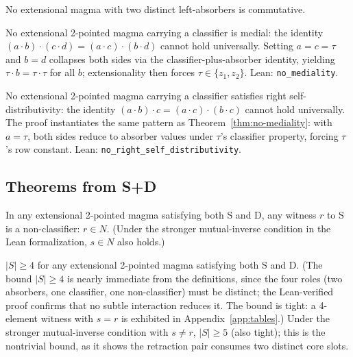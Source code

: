 \documentclass[sigconf,screen]{acmart}
\newcommand{\dotop}{\cdot}
\theoremstyle{remark}
\begin{document}
\begin{theorem}[Asymmetry]
\label{thm:asymmetry}
No extensional magma with two distinct left-absorbers is commutative.
\end{theorem}

\begin{theorem}[No Mediality]
\label{thm:no-mediality}
No extensional 2-pointed magma carrying a classifier is medial: the identity $(a \dotop b) \dotop (c \dotop d) = (a \dotop c) \dotop (b \dotop d)$ cannot hold universally. Setting $a = c = \tau$ and $b = d$ collapses both sides via the classifier-plus-absorber identity, yielding $\tau \dotop b = \tau \dotop \tau$ for all $b$; extensionality then forces $\tau \in \{z_1, z_2\}$. Lean: \texttt{no\_mediality}.
\end{theorem}

\begin{theorem}
\label{thm:no-rsd}
No extensional 2-pointed magma carrying a classifier satisfies right self-distributivity: the identity $(a \dotop b) \dotop c = (a \dotop c) \dotop (b \dotop c)$ cannot hold universally. The proof instantiates the same pattern as Theorem~\ref{thm:no-mediality}: with $a = \tau$, both sides reduce to absorber values under $\tau$'s classifier property, forcing $\tau$'s row constant. Lean: \texttt{no\_right\_self\_distributivity}.
\end{theorem}

\subsection{Theorems from S+D}

\begin{theorem}
\label{thm:placement}
In any extensional 2-pointed magma satisfying both S and D, any witness $r$ to S is a non-classifier: $r \in N$. (Under the stronger mutual-inverse condition in the Lean formalization, $s \in N$ also holds.)
\end{theorem}

\begin{theorem}
\label{thm:card}
$|S| \geq 4$ for any extensional 2-pointed magma satisfying both S and D. (The bound $|S| \geq 4$ is nearly immediate from the definitions, since the four roles (two absorbers, one classifier, one non-classifier) must be distinct; the Lean-verified proof confirms that no subtle interaction reduces it. The bound is tight: a 4-element witness with $s = r$ is exhibited in Appendix~\ref{app:tables}.) Under the stronger mutual-inverse condition with $s \neq r$, $|S| \geq 5$ (also tight); this is the nontrivial bound, as it shows the retraction pair consumes two distinct core slots.
\end{theorem}
\end{document}
